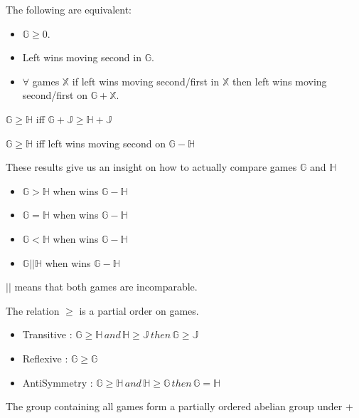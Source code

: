 \documentclass[12pt]{beamer}
\begin{document}
\begin{frame}

\begin{theorem}
The following are equivalent:
\begin{itemize}
\item $\mathbb{G} \geq 0$.
\pause
\item Left wins moving second in $ \mathbb{G} $.
\pause
\item $\forall$ games $ \mathbb{X} $ if left wins moving second/first in $ \mathbb{X} $ then left wins moving second/first on $ \mathbb{G + X} $.
\end{itemize}
\end{theorem}
\pause
\begin{theorem}
$\mathbb{G} \geq \mathbb{H}$ iff $\mathbb{G+J} \geq \mathbb{H+J}$
\end{theorem}
\pause
\begin{theorem}
$\mathbb{G} \geq \mathbb{H}$ iff left wins moving second on $\mathbb{G-H}$
\end{theorem}
\pause
These results give us an insight on how to actually compare games $\mathbb{G}$ and $\mathbb{H}$
\begin{itemize}
\item $\mathbb{G > H}$ when  wins $\mathbb{G-H}$
\item $\mathbb{G = H}$ when  wins $\mathbb{G-H}$
\end{itemize}
\end{frame}

\begin{frame}
\begin{itemize}
\item $\mathbb{G < H}$ when  wins $\mathbb{G-H}$
\item $\mathbb{G || H}$ when  wins $\mathbb{G-H}$
\end{itemize}

$||$ means that both games are incomparable.
\pause
\begin{theorem}
The relation $\geq$ is a partial order on games.
\begin{itemize}
\item Transitive : $\mathbb{G \geq H} \, and \, \mathbb{H \geq J} \, then \, \mathbb{G \geq J}$
\item Reflexive : $\mathbb{G \geq G}$
\item AntiSymmetry : $\mathbb{G \geq H}\, and\, \mathbb{H \geq G} \, then \, \mathbb{G = H} $
\end{itemize}
\end{theorem}
\pause
\begin{theorem}
The group containing all games form a partially ordered abelian group under +
\end{theorem}
\end{frame}
\end{document}

